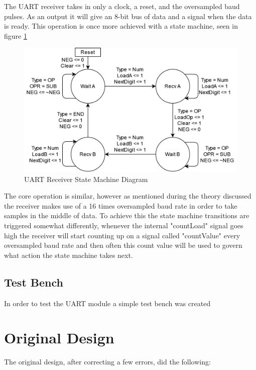 \documentclass[11pt]{article}
\begin{document}
The UART receiver takes in only a clock, a reset, and the oversampled baud pulses.
As an output it will give an 8-bit bus of data and a signal when the data is ready.
This operation is once more achieved with a state machine, seen in figure \ref{fig:receivesm}

\begin{figure}[H]        
    \centering
    \includegraphics[width=.66\textwidth]{DecoderSM.drawio.png}
    \caption{UART Receiver State Machine Diagram}
    \label{fig:receivesm}
\end{figure} 

The core operation is similar, however as mentioned during the theory discussed the receiver makes use of a 16 times oversampled baud rate in order to take samples in the middle of data.
To achieve this the state machine transitions are triggered somewhat differently,
whenever the internal "countLoad" signal goes high the receiver will start counting up on a signal called "countValue" every oversampled baud rate and then often this count value will be used to govern what action the state machine takes next.

\subsection{Test Bench}
In order to test the UART module a simple test bench was created

\section{Original Design}
The original design, after correcting a few errors, did the following:
\end{document}
